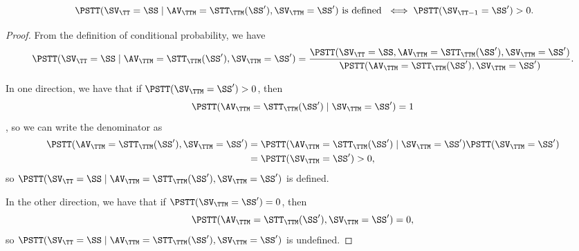 \def\quant{\PSTT(\SV_\TT = \SS \mid \AV_\TTM = \STT_\TTM(\SS'), \SV_\TTM = \SS')}
\begin{proposition}
  $$\text{ $\quant$ is defined } 
  \iff \PSTT(\SV_{\TT - 1} = \SS') > 0.$$%
\end{proposition}

\begin{proof}
  From the definition of conditional probability, we have
  $$ \quant 
  = \frac{\PSTT(\SV_\TT = \SS, \AV_\TTM = \STT_\TTM(\SS'), \SV_\TTM = \SS')}
    {\PSTT(\AV_\TTM = \STT_\TTM(\SS'), \SV_\TTM = \SS')}.$$

  In one direction, we have that if $\PSTT(\SV_\TTM = \SS') > 0$, then 
  $$\PSTT(\AV_\TTM = \STT_\TTM(\SS')\mid \SV_\TTM = \SS') = 1$$ 
  , so
  we can write the denominator as
  \begin{align*}
    \PSTT(\AV_\TTM = \STT_\TTM(\SS'), \SV_\TTM = \SS') &= \PSTT(\AV_\TTM = \STT_\TTM(\SS')\mid \SV_\TTM = \SS')
    \PSTT(\SV_\TTM = \SS')\\
                                                     &= \PSTT(\SV_\TTM = \SS') > 0,
  \end{align*}
  so $\quant$ is defined.

  In the other direction, we have that if $\PSTT(\SV_\TTM = \SS') = 0$, then 
  $$ \PSTT(\AV_\TTM = \STT_\TTM(\SS'), \SV_\TTM = \SS') = 0,$$ 
  so $\quant$
  is undefined.
\end{proof}
